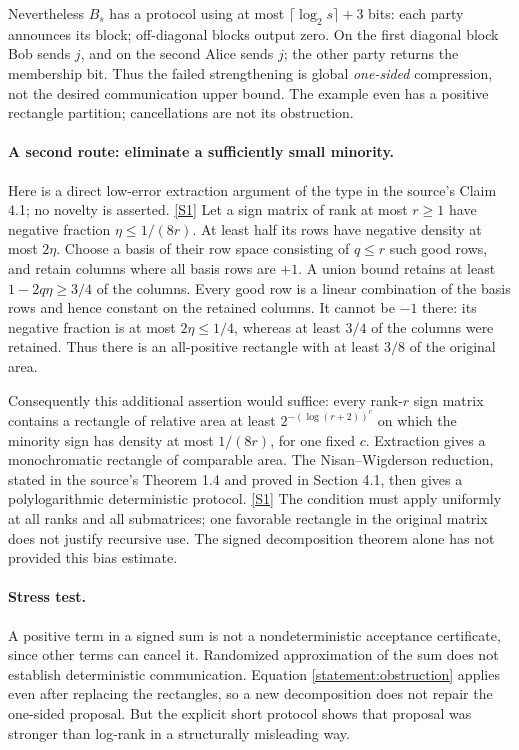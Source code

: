 \documentclass[11pt,a4paper]{article}
\newcommand{\sref}[2]{\hyperlink{source:#1:#2}{[S#2]}}
\numberwithin{equation}{section}
\begin{document}
Nevertheless $B_s$ has a protocol using at most
$\lceil\log_2s\rceil+3$ bits: each party announces its block; off-diagonal
blocks output zero. On the first diagonal block Bob sends $j$, and on the
second Alice sends $j$; the other party returns the membership bit.
Thus the failed strengthening is global \emph{one-sided} compression,
not the desired communication upper bound. The example even has a positive
rectangle partition; cancellations are not its obstruction.

\paragraph{A second route: eliminate a sufficiently small minority.}
Here is a direct low-error extraction argument of the type in the source's
Claim 4.1; no novelty is asserted. \sref{statement}{1} Let a sign matrix of rank
at most $r\ge1$ have negative fraction $\eta\le1/(8r)$. At least half its
rows have negative density at most $2\eta$. Choose a basis of their row
space consisting of $q\le r$ such good rows, and retain columns where all
basis rows are $+1$. A union bound retains at least
$1-2q\eta\ge3/4$ of the columns. Every good row is a linear combination
of the basis rows and hence constant on the retained columns. It cannot be
$-1$ there: its negative fraction is at most $2\eta\le1/4$, whereas at
least $3/4$ of the columns were retained. Thus there is an all-positive
rectangle with at least $3/8$ of the original area.

Consequently this additional assertion would suffice: every rank-$r$ sign
matrix contains a rectangle of relative area at least
$2^{-(\log(r+2))^c}$ on which the minority sign has density at most $1/(8r)$,
for one fixed $c$. Extraction gives a monochromatic rectangle of comparable
area. The Nisan--Wigderson reduction, stated in the source's Theorem 1.4
and proved in Section 4.1, then gives a polylogarithmic deterministic
protocol. \sref{statement}{1} The condition must apply uniformly at all ranks and
all submatrices; one favorable rectangle in the original matrix does not
justify recursive use. The signed decomposition theorem alone has not
provided this bias estimate.

\paragraph{Stress test.}
A positive term in a signed sum is not a nondeterministic acceptance
certificate, since other terms can cancel it. Randomized approximation of
the sum does not establish deterministic communication. Equation
\eqref{statement:obstruction} applies even after replacing the rectangles, so a
new decomposition does not repair the one-sided proposal. But the explicit
short protocol shows that proposal was stronger than log-rank in a
structurally misleading way.
\end{document}
